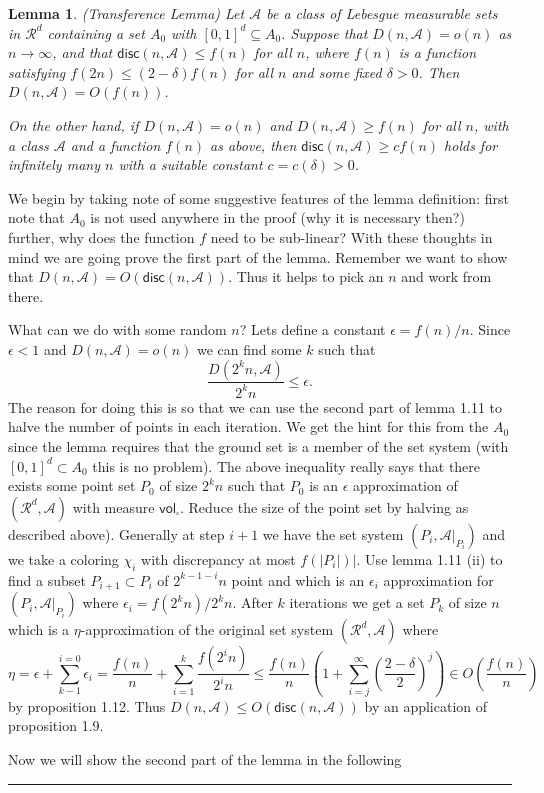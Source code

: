 \documentclass[twoside]{article}
\newtheorem{lemma}[theorem]{Lemma}
\newenvironment{proof}{{\bf Proof:}}{\hfill\rule{2mm}{2mm}}
\newcommand\vol{\mathsf{vol}}
\newcommand\R{\mathcal{R}}
\newcommand\disc{\mathsf{disc}}
\newcommand\A{\mathcal{A}}
\begin{document}
\begin{lemma}
(Transference Lemma) Let $\A$ be a class of Lebesgue measurable sets in $\R^d$ containing a set $A_0$ with $[0,  1]^d \subseteq A_0$. Suppose that $D(n, \A) = o(n)$ as $n \rightarrow \infty$, and that $\disc(n, \A) \leq f(n)$ for all $n$, where $f(n)$ is a function satisfying $f(2n) \leq (2-\delta)f(n)$ for all $n$ and some fixed $\delta > 0$. Then $D(n, \A) = O(f(n))$.

On the other hand, if $D(n, \A) = o(n)$ and $D(n, \A) \geq f(n)$ for all $n$, with a class $\A$ and a function $f(n)$ as above, then $\disc(n, \A) \geq cf(n)$ holds for infinitely many $n$ with a suitable constant $c = c(\delta) > 0$.
\end{lemma}
\begin{proof}
We begin by taking note of some suggestive features of the lemma definition: first note that $A_0$ is not used anywhere in the proof (why it is necessary then?) further, why does the function $f$ need to be sub-linear? With these thoughts in mind we are going prove the first part of the lemma. Remember we want to show that $D(n, \A) = O(\disc(n, \A))$. Thus it helps to pick an $n$ and work from there. 

What can we do with some random $n$? Lets define a constant $\epsilon = f(n)/n$. Since $\epsilon < 1$ and $D(n, \A) = o(n)$ we can find some $k$ such that
\[\frac{D(2^k n, \A)}{2^kn} \leq \epsilon.\]
The reason for doing this is so that we can use the second part of lemma 1.11 to halve the number of points in each iteration. We get the hint for this from the $A_0$ since the lemma requires that the ground set is a member of the set system (with $[0,1]^d \subset A_0$ this is no problem). The above inequality really says that there exists some point set $P_0$ of size $2^kn$ such that $P_0$ is an $\epsilon$ approximation of $(\R^d, \A)$ with measure $\vol_{\square}$. Reduce the size of the point set by halving as described above). Generally at step $i+1$ we have the set system $(P_i, \A|_{P_i})$ and we take a coloring $\chi_i$ with discrepancy at most $f(|P_i|)|$. Use lemma 1.11 (ii) to find a subset $P_{i+1} \subset P_i$ of $2^{k-1-i}n$ point and which is an $\epsilon_{i}$ approximation for $(P_i, \A|_{P_i})$ where $\epsilon_{i} = f(2^kn)/2^kn$. After $k$ iterations we get a set $P_k$ of size $n$ which is a $\eta$-approximation of the original set system $(\R^d, \A)$ where 
\[\eta = \epsilon + \sum_{k-1}^{i=0} \epsilon_i = \frac{f(n)}{n} + \sum^{k}_{i=1} \frac{f(2^in)}{2^in} \leq \frac{f(n)}{n}\left( 1 + \sum_{i=j}^{\infty} \left(\frac{2-\delta}{2}\right)^j \right) \in O\left(\frac{f(n)}{n}\right)\]  
by proposition 1.12. Thus $D(n, \A) \leq O(\disc(n, \A))$ by an application of proposition 1.9.

Now we will show the second part of the lemma in the following
\end{proof}
\end{document}
